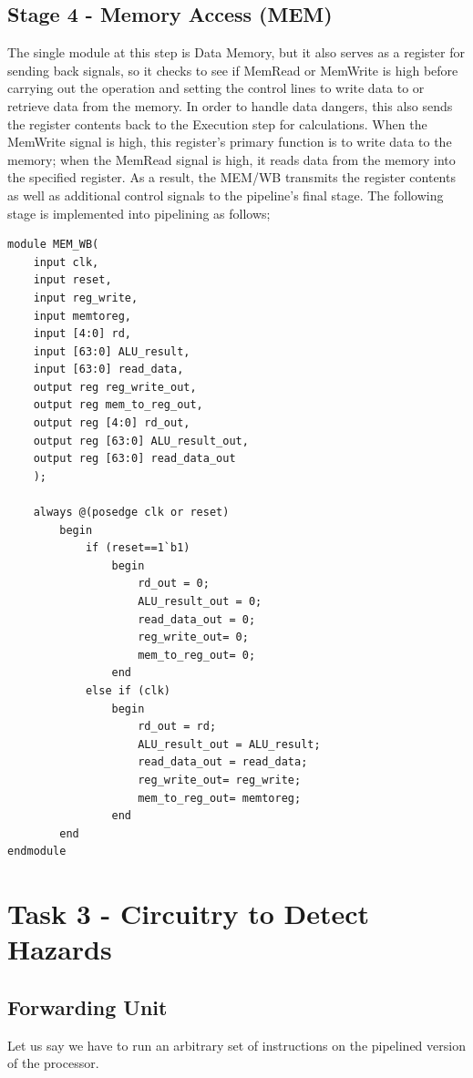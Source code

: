 \documentclass{article}
\begin{document}
\subsection{Stage 4 - Memory Access (MEM)}

The single module at this step is Data Memory, but it also serves as a register for sending back signals, so it checks to see if MemRead or MemWrite is high before carrying out the operation and setting the control lines to write data to or retrieve data from the memory. In order to handle data dangers, this also sends the register contents back to the Execution step for calculations. When the MemWrite signal is high, this register's primary function is to write data to the memory; when the MemRead signal is high, it reads data from the memory into the specified register. As a result, the MEM/WB transmits the register contents as well as additional control signals to the pipeline's final stage. The following stage is implemented into pipelining as follows;

\begin{lstlisting}[caption={MEM/WB Register}, captionpos=b, language=RISC-V]
module MEM_WB(
    input clk,
    input reset,
    input reg_write,
    input memtoreg,
    input [4:0] rd,
    input [63:0] ALU_result,
    input [63:0] read_data,
    output reg reg_write_out,
    output reg mem_to_reg_out,
    output reg [4:0] rd_out,
    output reg [63:0] ALU_result_out,
    output reg [63:0] read_data_out 
    );
       
    always @(posedge clk or reset)
        begin
            if (reset==1`b1)
                begin
                    rd_out = 0;
                    ALU_result_out = 0;
                    read_data_out = 0;
                    reg_write_out= 0;
                    mem_to_reg_out= 0;            	
                end
            else if (clk)
                begin
                    rd_out = rd;
                    ALU_result_out = ALU_result;
                    read_data_out = read_data;
                    reg_write_out= reg_write;
                    mem_to_reg_out= memtoreg;            	
                end
        end        
endmodule
\end{lstlisting}

\section{Task 3 - Circuitry to Detect Hazards}

\subsection{Forwarding Unit}
Let us say we have to run an arbitrary set of instructions on the pipelined version of the processor. 
\end{document}
